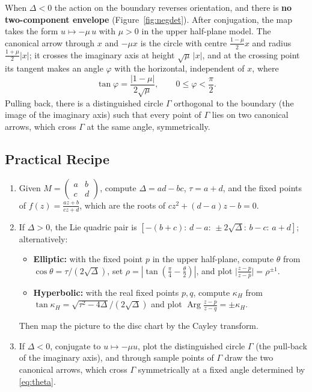 \documentclass[12pt, a4paper]{report}
\theoremstyle{plain}
\theoremstyle{definition}
\theoremstyle{remark}
\theoremstyle{plain}
\newcommand{\Arg}{\operatorname{Arg}}
\newcommand{\bmat}[1]{\begin{pmatrix}#1\end{pmatrix}}
\begin{document}
When $\Delta<0$ the action on the boundary reverses orientation, and there is \textbf{no two-component envelope} (Figure~\ref{fig:negdet}). After conjugation, the map takes the form $u\mapsto -\mu\,u$ with $\mu>0$ in the upper half-plane model. The canonical arrow through $x$ and $-\mu x$ is the circle with centre $\frac{1-\mu}2x$ and radius $\frac{1+\mu}2|x|$; it crosses the imaginary axis at height $\sqrt\mu\,|x|$, and at the crossing point its tangent makes an angle $\varphi$ with the horizontal, independent of $x$, where
\begin{equation}\label{eq:theta}
\tan\varphi=\frac{|1-\mu|}{2\sqrt{\mu}},\qquad 0\leq\varphi<\frac{\pi}{2}.
\end{equation}
Pulling back, there is a distinguished circle $\Gamma$ orthogonal to the boundary (the image of the imaginary axis) such that every point of $\Gamma$ lies on two canonical arrows, which cross $\Gamma$ at the same angle, symmetrically.

\subsection{Practical Recipe}
\begin{enumerate}
\item Given $M=\bmat{a&b\\ c&d}$, compute $\Delta=ad-bc$, $\tau=a+d$, and the fixed points of $f(z)=\frac{az+b}{cz+d}$, which are the roots of $cz^2+(d-a)z-b=0$.
\item If $\Delta>0$, the Lie quadric pair is $[-(b+c):\,d-a:\,\pm2\sqrt{\Delta}:\,b-c:\,a+d]$; alternatively:
  \begin{itemize}
  \item \textbf{Elliptic:} with the fixed point $p$ in the upper half-plane, compute $\theta$ from $\cos\theta=\tau/(2\sqrt{\Delta})$, set $\rho=|\tan(\frac\pi4-\frac\theta2)|$, and plot $\bigl|\frac{z-p}{z-\bar p}\bigr|=\rho^{\pm1}$.
  \item \textbf{Hyperbolic:} with the real fixed points $p,q$, compute $\kappa_H$ from $\tan\kappa_H=\sqrt{\tau^2-4\Delta}/(2\sqrt{\Delta})$ and plot $\Arg\frac{z-p}{z-q}=\pm\kappa_H$.
  \end{itemize}
  Then map the picture to the disc chart by the Cayley transform.
\item If $\Delta<0$, conjugate to $u\mapsto-\mu u$, plot the distinguished circle $\Gamma$ (the pull-back of the imaginary axis), and through sample points of $\Gamma$ draw the two canonical arrows, which cross $\Gamma$ symmetrically at a fixed angle determined by \eqref{eq:theta}.
\end{enumerate}
\end{document}
